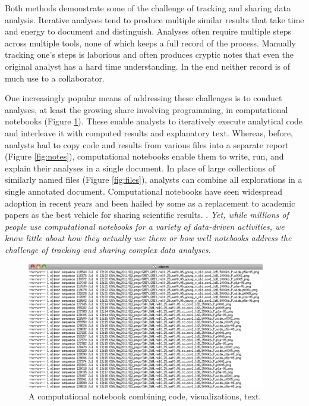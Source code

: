 Both methods demonstrate some of the challenge of tracking and sharing data analysis. Iterative analyses tend to produce multiple similar results that take time and energy to document and distinguish. Analyses often require multiple steps across multiple tools, none of which keeps a full record of the process. Manually tracking one's steps is laborious and often produces cryptic notes that even the original analyst has a hard time understanding. In the end neither record is of much use to a collaborator. 

One increasingly popular means of addressing these challenges is to conduct analyses, at least the growing share involving programming, in computational notebooks (Figure \ref{fig:notebook}). These enable analysts to iteratively execute analytical code and interleave it with computed results and explanatory text. Whereas, before, analysts had to copy code and results from various files into a separate report (Figure \ref{fig:notes}), computational notebooks enable them to write, run, and explain their analyses in a single document. In place of large collections of similarly named files (Figure \ref{fig:files}), analysts can combine all explorations in a single annotated document. Computational notebooks have seen widespread adoption in recent years \cite{granger2017jupyterlab} and been hailed by some as a replacement to academic papers as the best vehicle for sharing scientific results. \cite{somers2018scientific}. \emph{Yet, while millions of people use computational notebooks for a variety of data-driven activities, we know little about how they actually use them or how well notebooks address the challenge of tracking and sharing complex data analyses.}

\begin{figure}[b!] 
  \centering
  \includegraphics[width=0.93\textwidth]{img/files}
  \caption[A computational notebook]
{A computational notebook combining code, visualizations, text.}
  \label{fig:notebook}
\end{figure}

